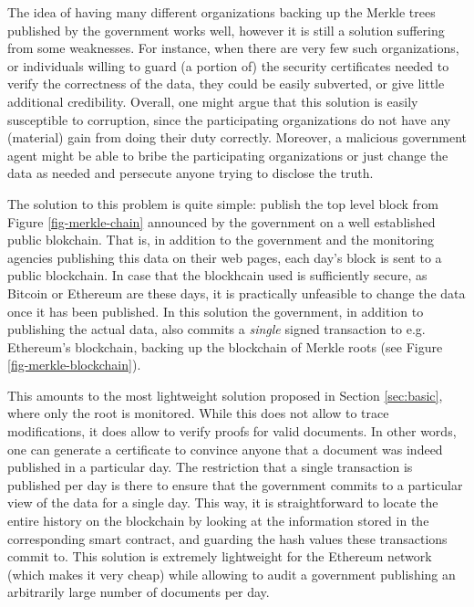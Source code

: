 
The idea of having many different organizations backing up the Merkle trees published by the government works well, however it is still a solution suffering from some weaknesses. For instance, when there are very few such organizations, or individuals willing to guard (a portion of) the security certificates needed to verify the correctness of the data, they could be easily subverted, or give little additional credibility. Overall, one might argue that this solution is easily susceptible to corruption, since the participating organizations do not have any (material) gain from doing their duty correctly. Moreover, a malicious government agent might be able to bribe the participating organizations or just change the data as needed and persecute anyone trying to disclose the truth.

The solution to this problem is quite simple: publish the top level block from Figure \ref{fig-merkle-chain} announced by the government on a well established public blokchain. That is, in addition to the government and the monitoring agencies publishing this data on their web pages, each day's block is sent to a public blockchain. In case that the blockhcain used is sufficiently secure, as Bitcoin or Ethereum are these days, it is practically unfeasible to change the data once it has been published. In this solution the government, in addition to publishing the actual data, also commits a {\em single} signed transaction to e.g. Ethereum's blockchain, backing up the blockchain of Merkle roots (see Figure \ref{fig-merkle-blockchain}).

This amounts to the most lightweight solution proposed in Section \ref{sec:basic}, where only the root is monitored. While this does not allow to trace modifications, it does allow to verify proofs for valid documents. In other words, one can generate a certificate to convince anyone that a document was indeed published in a particular day. The restriction that a single transaction is published per day is there to ensure that the government commits to a particular view of the data for a single day. This way, it is straightforward to locate the entire history on the blockchain by looking at the information stored in the corresponding smart contract, and guarding the hash values these transactions commit to. This solution is extremely lightweight for the Ethereum network (which makes it very cheap) while allowing to audit a government publishing an arbitrarily large number of documents per day.

